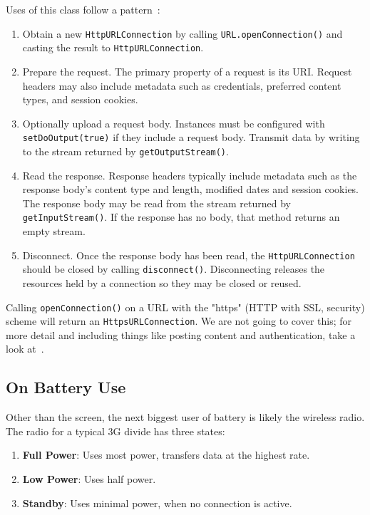 Uses of this class follow a pattern~\cite{httpurl}:
\begin{enumerate}
\item Obtain a new \texttt{HttpURLConnection} by calling \texttt{URL.openConnection()} and casting the result to \texttt{HttpURLConnection}.
\item Prepare the request. The primary property of a request is its URI. Request headers may also include metadata such as credentials, preferred content types, and session cookies.
\item Optionally upload a request body. Instances must be configured with \texttt{setDoOutput(true)} if they include a request body. Transmit data by writing to the stream returned by \texttt{getOutputStream()}.
\item Read the response. Response headers typically include metadata such as the response body's content type and length, modified dates and session cookies. The response body may be read from the stream returned by \texttt{getInputStream()}. If the response has no body, that method returns an empty stream.
\item Disconnect. Once the response body has been read, the \texttt{HttpURLConnection} should be closed by calling \texttt{disconnect()}. Disconnecting releases the resources held by a connection so they may be closed or reused.
\end{enumerate}

Calling \texttt{openConnection()} on a URL with the "https" (HTTP with SSL, security) scheme will return an \texttt{HttpsURLConnection}. We are not going to cover this; for more detail and including things like posting content and authentication, take a look at~\cite{httpurl}.

\subsection*{On Battery Use}
Other than the screen, the next biggest user of battery is likely the wireless radio. The radio for a typical 3G divide has three states:

\begin{enumerate}
	\item \textbf{Full Power}: Uses most power, transfers data at the highest rate.
	\item \textbf{Low Power}: Uses half power.
	\item \textbf{Standby}: Uses minimal power, when no connection is active.
\end{enumerate}

